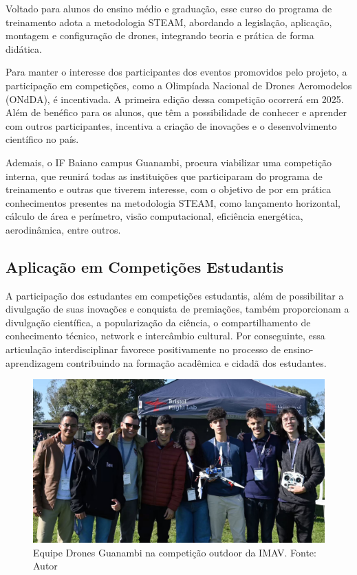 \documentclass[conference]{IEEEtran}
\begin{document}
Voltado para alunos do ensino médio e graduação, esse curso do programa de treinamento adota a metodologia STEAM, abordando a legislação, aplicação, montagem e configuração de drones, integrando teoria e prática de forma didática.

Para manter o interesse dos participantes dos eventos promovidos pelo projeto, a participação em competições, como a Olimpíada Nacional de Drones Aeromodelos (ONdDA), é incentivada. A primeira edição dessa competição ocorrerá em 2025. Além de benéfico para os alunos, que têm a possibilidade de conhecer e aprender com outros participantes, incentiva a criação de inovações e o desenvolvimento científico no país. 

Ademais, o IF Baiano campus Guanambi, procura viabilizar uma competição interna, que reunirá todas as instituições que participaram do programa de treinamento e outras que tiverem interesse, com o objetivo de por em prática conhecimentos presentes na metodologia STEAM, como lançamento horizontal, cálculo de área e perímetro, visão computacional, eficiência energética, aerodinâmica, entre outros.

\subsection{Aplicação em Competições Estudantis}

A participação dos estudantes em competições estudantis, além de possibilitar a divulgação de suas inovações e conquista de premiações, também proporcionam a divulgação científica, a popularização da ciência, o compartilhamento de conhecimento técnico, network e intercâmbio cultural. Por conseguinte, essa articulação interdisciplinar favorece positivamente no processo de ensino-aprendizagem contribuindo na formação acadêmica e cidadã dos estudantes.

\begin{figure}[!htb]
    \centering
    \includegraphics[scale=0.30]{img/imav2024.png} 
    \caption{Equipe Drones Guanambi na competição outdoor da IMAV. Fonte: Autor}
    \label{fig:imav}
\end{figure}
\end{document}
